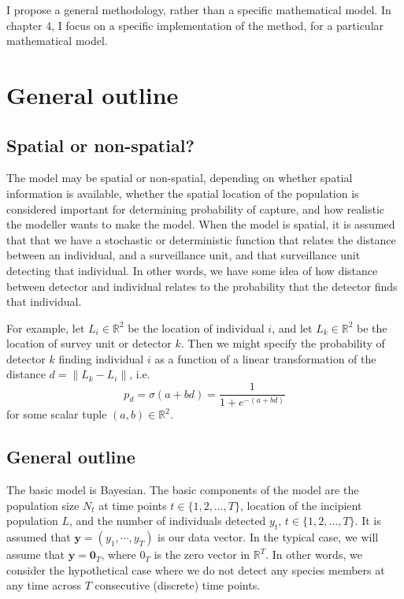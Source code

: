 \documentclass[
]{book}
\begin{document}
I propose a general methodology, rather than a specific mathematical model. In chapter 4, I focus on a specific implementation of the method, for a particular mathematical model.

\hypertarget{general-outline}{%
\section{General outline}\label{general-outline}}

\hypertarget{spatial-or-non-spatial}{%
\subsection{Spatial or non-spatial?}\label{spatial-or-non-spatial}}

The model may be spatial or non-spatial, depending on whether spatial information is available, whether the spatial location of the population is considered important for determining probability of capture, and how realistic the modeller wants to make the model. When the model is spatial, it is assumed that that we have a stochastic or deterministic function that relates the distance between an individual, and a surveillance unit, and that surveillance unit detecting that individual. In other words, we have some idea of how distance between detector and individual relates to the probability that the detector finds that individual.

For example, let \(L_i \in \mathbb R^2\) be the location of individual \(i\), and let \(L_k \in \mathbb R^2\) be the location of survey unit or detector \(k\). Then we might specify the probability of detector \(k\) finding individual \(i\) as a function of a linear transformation of the distance \(d = \lVert L_k - L_i \rVert\), i.e.~\[
p_d = \sigma(a+bd) = \frac{1}{1+e^{-(a + bd)}}
\] for some scalar tuple \((a, b) \in \mathbb R^2\).

\hypertarget{general-outline-1}{%
\subsection{General outline}\label{general-outline-1}}

The basic model is Bayesian. The basic components of the model are the population size \(N_t\) at time points \(t \in \{1, 2, \ldots, T\}\), location of the incipient population \(L\), and the number of individuals detected \(y_t\), \(t \in \{1, 2, \ldots, T\}\). It is assumed that \(\mathbf y = (y_1, \cdots, y_T)\) is our data vector. In the typical case, we will assume that \(\mathbf y = \mathbf 0_T\), where \(0_T\) is the zero vector in \(\mathbb R^T\). In other words, we consider the hypothetical case where we do not detect any species members at any time across \(T\) consecutive (discrete) time points.
\end{document}
